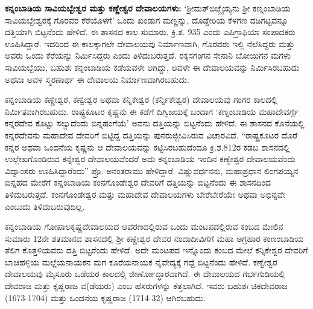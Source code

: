 \textbf{ಕನ್ನಂಬಾಡಿಯ ಸಾವಿಯಬ್ಬೇಶ್ವರ ಮತ್ತು ಕಣ್ಣೇಶ್ವರ ದೇವಾಲಯಗಳು:} ‘ಶ‍್ರೀಮತ್​ ಬಿಜ್ಜೈಯ್ಯನು ಶ‍್ರೀ ಕಣ್ನಂಬಾಡಿಯ ಸಾವಿಯಬ್ಬೇಶ್ವರಕ್ಕೆ ಗೊರವರ ಕೆರೆಯೊಳಗೆ’ ಒಂದು ಖಂಡುಗ ಮಣ್ಣನ್ನು, ದೊಡ್ಡೇರಿಯ ಕೆಳಗಣ ದಡಿಗಟ್ಟವನ್ನೂ ದತ್ತಿಯಾಗಿ ಬಿಟ್ಟನೆಂದು ಹೇಳಿದೆ. ಈ ಶಾಸನದ ಕಾಲ ಸುಮಾರು. ಕ್ರಿ.ಶ. 935 ಎಂದು ಎಪಿಗ್ರಾಫಿಯಾ ಸಂಪಾದಕರು ಊಹಿಸಿದ್ದಾರೆ. ಇದರಿಂದ ಈ ಕಾಲಕ್ಕಾಗಲೇ ದೇವಾಲಯವು ನಿರ್ಮಾಣವಾಗಿ, ಗೊರವರು ಇಲ್ಲಿ ನೆಲೆಸಿದ್ದರು ಮತ್ತು ಅವರು ಒಂದು ಕೆರೆಯನ್ನು ನಿರ್ಮಿಸಿದ್ದರು ಎಂದು ತಿಳಿದುಬರುತ್ತದೆ. ರಕ್ಕಸಗಂಗನ ಸೇನಾನಿ ಬೋಯಿಗನ ಮಗಳು ಸಾವಿಯಬ್ಬೆಯು, ಬಹುಶಃ ಕನ್ನಂಬಾಡಿಯ ಕಡೆಯವಳೇ ಆಗಿದ್ದು, ಅವಳೇ ಈ ದೇವಾಲಯವನ್ನು ನಿರ್ಮಿಸಿರಬಹುದು ಅಥವಾ ಅವಳ ಸ್ಮರಣಾರ್ಥ ಈ ದೇವಾಲಯ ನಿರ್ಮಾಣವಾಗಿರಬಹುದು.

ಕನ್ನಂಬಾಡಿಯ ಕಣ್ಣೇಶ್ವರ, ಕಣ್ವೇಶ್ವರ ಅಥವಾ ಕನ್ನಿಕೇಶ್ವರ (ಕರ್ನ್ನಿಕೇಶ್ವರ) ದೇವಾಲಯವು ಗಂಗರ ಕಾಲದಲ್ಲಿ ನಿರ್ಮಿತವಾಗಿರಬಹುದು. ರಾಷ್ಟ್ರಕೂಟರ ಕೃಷ್ಣನು ಈ ಕಡೆಗೆ ದಿಗ್ವಿಜಯಕ್ಕೆ ಬಂದಾಗ ‘ಕಣ್ನಂಬಾಡಿಯ ಮಹಾದೇವರ್ಗ್ಗೆ ಕನ್ನರದೇವ ಕೊಟ್ಟು ಸಲ್ವುದೆಂದು ಬಿನ್ನಹಂಗೆಯೆ’ ಅವನು ದತ್ತಿಯನ್ನು ಬಿಟ್ಟನೆಂದು ಹೇಳಿದೆ. ಈ ಶಾಸನದ ಕೊನೆಯಲ್ಲಿ ಕನ್ನರದೇವನು ಮಹಾದೇವ ದೇವರಿಗೆ ಬಿಟ್ಟಿದ್ದ ದತ್ತಿಯನ್ನು ಪುನರುಜ್ಜೀವಿಸಿರುವ ವಿಚಾರವಿದೆ. “ರಾಷ್ಟ್ರಕೂಟರ ದೊರೆ ಕನ್ನರ ಅಥವಾ ಒಂದನೆಯ ಕೃಷ್ಣನು ಆ ದೇವಾಲಯವನ್ನು ಕಟ್ಟಿಸಿರಬಹುದೆಂದೂ ಕ್ರಿ.ಶ.812ರ ಕಡಬ ಶಾಸನದಲ್ಲಿ ಉಲ್ಲೇಖಗೊಂಡಿರುವ ಕನ್ನೇಶ್ವರ ದೇವಾಲಯವೆಂದರೆ ಅದು ಕನ್ನಂಬಾಡಿಯ ಇಂದಿನ ಕಣ್ವೇಶ್ವರ ದೇವಾಲಯವೆಂದು ವಿದ್ವಾಂಸರು ಊಹಿಸಿದ್ದಾರೆಂದು” ಪ್ರೊ. ಅನಂತರಾಮು ಹೇಳಿದ್ದಾರೆ. ವಿಷ್ಣುವರ್ಧನನು, ಮಹಾಪ್ರಧಾನ ಲಿಂಗಪಯ್ಯನ ಬಿನ್ನಹದ ಮೇರೆಗೆ ಕನ್ನಂಬಾಡಿಯ ಕಂನಗೊಂಡೇಶ್ವರ ದೇವರಿಗೆ ದತ್ತಿಯನ್ನು ಬಿಟ್ಟನೆಂದು ಈ ಶಾಸನದಿಂದ ತಿಳಿದುಬರುತ್ತದೆ. ಕಂನಗೊಂಡೇಶ್ವರ ಮತ್ತು ಮಹಾದೇವ ದೇವಾಲಯಗಳು ಬೇರೆಬೇರೆಯೇ ಅಥವಾ ಅಭಿನ್ನವೇ ಎಂಬುದು ತಿಳಿದುಬರುವುದಿಲ್ಲ.

ಕನ್ನಂಬಾಡಿಯ ಗೋಪಾಲಕೃಷ್ಣದೇವಾಲಯದ ಆವರಣದಲ್ಲಿರುವ ಒಂದು ಮಂಟಪದಲ್ಲಿರುವ ಕಂಬದ ಮೇಲಿನ ಸುಮಾರು 12ನೇ ಶತಮಾನದ ಶಾಸನದಲ್ಲಿ ಶ‍್ರೀ ಕಣ್ಣೇಶ್ವರ ದೇವರ ನಂದಾದೀವಿಗೆಗೆ ಮಹಾ ಅಗ್ರಹಾರ ಕಂಣಂಬಾಡಿಯ ತೆಲಿಗ ಕೊತ್ತಳಿಯವರು ದತ್ತಿ ಬಿಟ್ಟರೆಂದು ಹೇಳಿದೆ. ಅದೇ ಮಂಟಪದ ಇನ್ನೊಂದು ಕಂಬದ ಮೇಲೆ ಕನ್ನಿಕೇಶ್ವರ ದೇವರಿಗೆ ಬಾಚಿಹಳ್ಳಿಯ ಮಲ್ಲೆಯನಾಯಕನ ಮಗ ಕೂರೆಯನಾಯಕ ನೈವೇದ್ಯಕ್ಕೆ ಗದ್ದೆ ಬಿಟ್ಟನೆಂದು ಹೇಳಿದೆ. ಕಣ್ವೇಶ್ವರ ದೇವಾಲಯವು ಮೈಸೂರು ಒಡೆಯರ ಕಾಲದಲ್ಲಿ ಜೀರ್ಣೋದ್ಧಾರವಾಗಿದೆ. ಈ ದೇವಾಲಯದ ಗರ್ಭಗುಡಿಯಲ್ಲಿ ದೇವರಾಜ ಮತ್ತು ಕೃಷ್ಣರಾಜ ವ(ಡೆಯರು) ಎಂಬ ಹೆಸರುಗಳನ್ನು ಕೆತ್ತಲಾಗಿದೆ. ಇವರು ಬಹುಶಃ ಚಿಕದೇವರಾಜ (1673-1704) ಮತ್ತು ಒಂದನೆಯ ಕೃಷ್ಣರಾಜ (1714-32) ಆಗಿರಬಹುದು.

